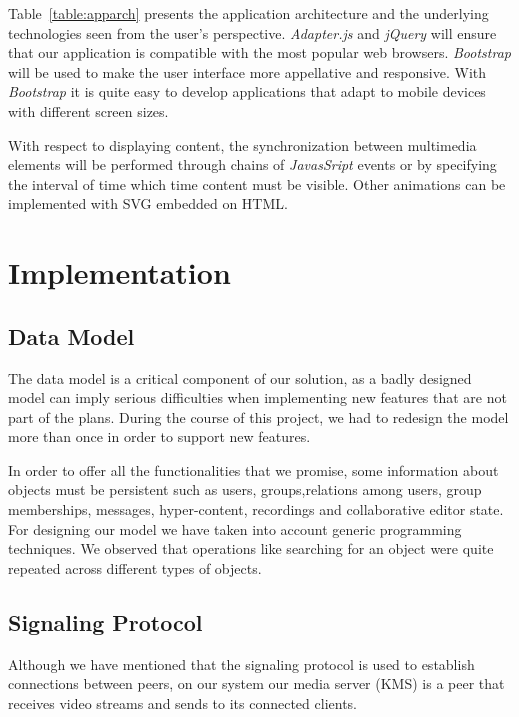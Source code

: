 \documentclass[10pt,conference]{IEEEtran}
\begin{document}
Table~\ref{table:apparch} presents the application architecture and the underlying technologies seen from the user's perspective. \emph{Adapter.js} and \emph{jQuery} will ensure that our application is compatible with the most popular web browsers.
\emph{Bootstrap} will be used to make the user interface more appellative and responsive. With \emph{Bootstrap} it is quite easy to develop applications that adapt to mobile devices with different screen sizes.

With respect to displaying content, the synchronization between multimedia elements will be performed through chains of \emph{JavasSript} events or by specifying the interval of time which time content must be visible. Other animations can be implemented with \gls{SVG} embedded on \gls{HTML}.

\section{Implementation}
\label{chapter:implementation}
\subsection{Data Model}

The data model is a critical component of our solution, as a badly designed model can imply serious difficulties when implementing new features that are not part of the plans. During the course of this project, we had to redesign the model more than once in order to support new features.

In order to offer all the functionalities that we promise, some information about objects must be persistent such as users, groups,relations among users, group memberships, messages, hyper-content, recordings and collaborative editor state. For designing our model we have taken into account generic programming techniques. We observed that operations like searching for an object were quite repeated across different types of objects. 

\subsection{Signaling Protocol}


Although we have mentioned that the signaling protocol is used to establish connections between peers, on our system our media server (\gls{KMS}) is a peer that receives video streams and sends to its connected clients. 
\end{document}
